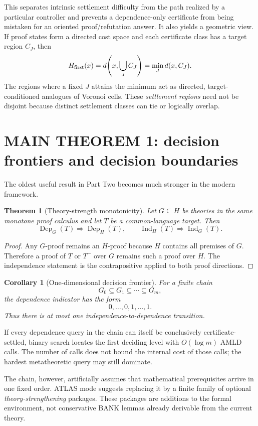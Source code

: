 \documentclass[11pt]{article}
\newtheorem{theorem}[definition]{Theorem}
\newtheorem{corollary}[definition]{Corollary}
\theoremstyle{remark}
\newcommand{\Dep}{\operatorname{Dep}}
\newcommand{\Ind}{\operatorname{Ind}}
\begin{document}
This separates intrinsic settlement difficulty from the path realized by a particular controller and prevents a dependence-only certificate from being mistaken for an oriented proof/refutation answer. It also yields a geometric view. If proof states form a directed cost space and each certificate class has a target region $C_J$, then
\[
H_{\rm first}(x)=d\!\left(x,\bigcup_J C_J\right)=\min_J d(x,C_J).
\]
The regions where a fixed $J$ attains the minimum act as directed, target-conditioned analogues of Voronoi cells. These \emph{settlement regions} need not be disjoint because distinct settlement classes can tie or logically overlap.

\section{MAIN THEOREM 1: decision frontiers and decision boundaries}

The oldest useful result in Part Two becomes much stronger in the modern framework.

\begin{theorem}[Theory-strength monotonicity]
Let $G\subseteq H$ be theories in the same monotone proof calculus and let $T$ be a common-language target. Then
\[
\Dep_G(T)\Rightarrow\Dep_H(T),
\qquad
\Ind_H(T)\Rightarrow\Ind_G(T).
\]
\end{theorem}

\begin{proof}
Any $G$-proof remains an $H$-proof because $H$ contains all premises of $G$. Therefore a proof of $T$ or $T^-$ over $G$ remains such a proof over $H$. The independence statement is the contrapositive applied to both proof directions.
\end{proof}

\begin{corollary}[One-dimensional decision frontier]
For a finite chain
\[
G_0\subseteq G_1\subseteq\cdots\subseteq G_m,
\]
the dependence indicator has the form
\[
0,\ldots,0,1,\ldots,1.
\]
Thus there is at most one independence-to-dependence transition.
\end{corollary}

If every dependence query in the chain can itself be conclusively certificate-settled, binary search locates the first deciding level with $O(\log m)$ AMLD calls. The number of calls does not bound the internal cost of those calls; the hardest metatheoretic query may still dominate.

The chain, however, artificially assumes that mathematical prerequisites arrive in one fixed order. ATLAS mode suggests replacing it by a finite family of optional \emph{theory-strengthening} packages. These packages are additions to the formal environment, not conservative BANK lemmas already derivable from the current theory.
\end{document}
